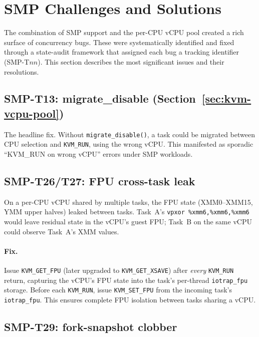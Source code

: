 \section{SMP Challenges and Solutions}
\label{sec:kvm-smp}

The combination of SMP support and the per-CPU vCPU pool created a rich
surface of concurrency bugs.  These were systematically identified and
fixed through a state-audit framework that assigned each bug a tracking
identifier (SMP-T$nn$).  This section describes the most significant
issues and their resolutions.

\subsection{SMP-T13: migrate\_disable (Section~\ref{sec:kvm-vcpu-pool})}

The headline fix.  Without \texttt{migrate\_disable()}, a task could be
migrated between CPU selection and \texttt{KVM\_RUN}, using the wrong
vCPU.  This manifested as sporadic ``KVM\_RUN on wrong vCPU'' errors
under SMP workloads.

\subsection{SMP-T26/T27: FPU cross-task leak}

On a per-CPU vCPU shared by multiple tasks, the FPU state
(XMM0--XMM15, YMM upper halves) leaked between tasks.  Task~A's
\texttt{vpxor \%xmm6,\%xmm6,\%xmm6} would leave residual state in the
vCPU's guest FPU; Task~B on the same vCPU could observe Task~A's
XMM values.

\paragraph{Fix.}
Issue \texttt{KVM\_GET\_FPU} (later upgraded to \texttt{KVM\_GET\_XSAVE})
after \emph{every} \texttt{KVM\_RUN} return, capturing the vCPU's FPU state
into the task's per-thread \texttt{iotrap\_fpu} storage.  Before each
\texttt{KVM\_RUN}, issue \texttt{KVM\_SET\_FPU} from the incoming task's
\texttt{iotrap\_fpu}.  This ensures complete FPU isolation between tasks
sharing a vCPU.

\subsection{SMP-T29: fork-snapshot clobber}

